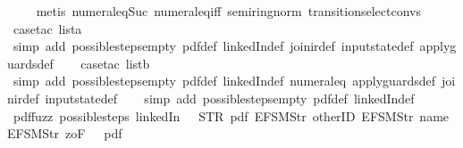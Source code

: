 \begin{isabellebody}
\ \ \ \isamarkupfalse%
\ {\isacharparenleft}metis\ numeral{\isacharunderscore}{}{\isacharunderscore}eq{\isacharunderscore}Suc{\isacharunderscore}{}\ numeral{\isacharunderscore}eq{\isacharunderscore}iff\ semiring{\isacharunderscore}norm{\isacharparenleft}{}{}{\isacharparenright}\ transition{\isachardot}select{\isacharunderscore}convs{\isacharparenleft}{}{\isacharparenright}{\isacharparenright}\isanewline
\ \ \isamarkupfalse%
\ {\isacharparenleft}case{\isacharunderscore}tac\ lista{\isacharparenright}\isanewline
\ \ \ \isamarkupfalse%
\ {\isacharparenleft}simp\ add{\isacharcolon}\ possible{\isacharunderscore}steps{\isacharunderscore}empty\ pdf{}{\isacharunderscore}def\ linkedIn{\isacharunderscore}def\ join{\isacharunderscore}ir{\isacharunderscore}def\ input{}state{\isacharunderscore}def\ apply{\isacharunderscore}guards{\isacharunderscore}def{\isacharparenright}\isanewline
\ \ \isamarkupfalse%
\ {\isacharparenleft}case{\isacharunderscore}tac\ listb{\isacharparenright}\isanewline
\ \ \ \isamarkupfalse%
\ {\isacharparenleft}simp\ add{\isacharcolon}\ possible{\isacharunderscore}steps{\isacharunderscore}empty\ pdf{}{\isacharunderscore}def\ linkedIn{\isacharunderscore}def\ numeral{\isacharunderscore}{}{\isacharunderscore}eq{\isacharunderscore}{}\ apply{\isacharunderscore}guards{\isacharunderscore}def\ join{\isacharunderscore}ir{\isacharunderscore}def\ input{}state{\isacharunderscore}def{\isacharparenright}\isanewline
\ \ \isamarkupfalse%
\ {\isacharparenleft}simp\ add{\isacharcolon}\ possible{\isacharunderscore}steps{\isacharunderscore}empty\ pdf{}{\isacharunderscore}def\ linkedIn{\isacharunderscore}def{\isacharparenright}%
\endisatagproof
{\isafoldproof}%
%
\isadelimproof
\isanewline
%
\endisadelimproof
\isanewline
{}\isamarkupfalse%
\ pdf{\isacharunderscore}fuzz{\isacharcolon}\ {\isachardoublequoteopen}possible{\isacharunderscore}steps\ linkedIn\ {}\ {\isacharless}{\isachargreater}\ STR\ {\isacharprime}{\isacharprime}pdf{\isacharprime}{\isacharprime}\ {\isacharbrackleft}EFSM{\isachardot}Str\ {\isacharprime}{\isacharprime}otherID{\isacharprime}{\isacharprime}{\isacharcomma}\ EFSM{\isachardot}Str\ {\isacharprime}{\isacharprime}name{\isacharprime}{\isacharprime}{\isacharcomma}\ EFSM{\isachardot}Str\ {\isacharprime}{\isacharprime}{}zoF{\isacharprime}{\isacharprime}{\isacharbrackright}\ {\isacharequal}\ {\isacharbraceleft}{\isacharbar}{\isacharparenleft}{}{\isacharcomma}\ pdf{}{\isacharparenright}{\isacharbar}{\isacharbraceright}{\isachardoublequoteclose}\isanewline

\end{isabellebody}
